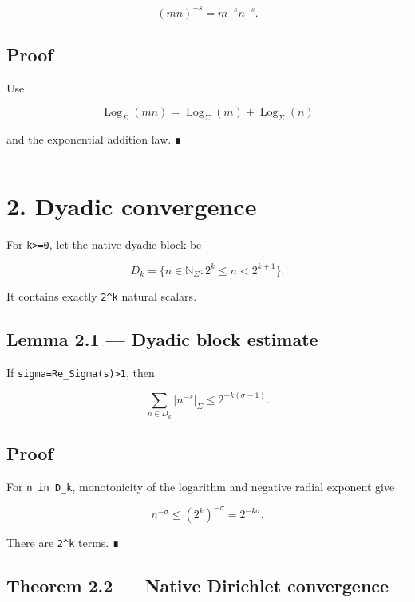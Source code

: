 \[
\boxed{(mn)^{-s}=m^{-s}n^{-s}.}
\]

\hypertarget{proof-1}{%
\subsection{Proof}\label{proof-1}}

Use

\[
\operatorname{Log}_\Sigma(mn)
=
\operatorname{Log}_\Sigma(m)+
\operatorname{Log}_\Sigma(n)
\]

and the exponential addition law. ∎

\begin{center}\rule{0.5\linewidth}{0.5pt}\end{center}

\hypertarget{dyadic-convergence}{%
\section{2. Dyadic convergence}\label{dyadic-convergence}}

For \texttt{k\textgreater{}=0}, let the native dyadic block be

\[
D_k=\{n\in\mathbb N_\Sigma:2^k\le n<2^{k+1}\}.
\]

It contains exactly \texttt{2\^{}k} natural scalars.

\hypertarget{lemma-2.1-dyadic-block-estimate}{%
\subsection{Lemma 2.1 --- Dyadic block estimate}\label{lemma-2.1-dyadic-block-estimate}}

If \texttt{sigma=Re\_Sigma(s)\textgreater{}1}, then

\[
\boxed{
\sum_{n\in D_k}|n^{-s}|_\Sigma
\le
2^{-k(\sigma-1)}.
}
\]

\hypertarget{proof-2}{%
\subsection{Proof}\label{proof-2}}

For \texttt{n\ in\ D\_k}, monotonicity of the logarithm and negative radial exponent give

\[
n^{-\sigma}\le(2^k)^{-\sigma}=2^{-k\sigma}.
\]

There are \texttt{2\^{}k} terms. ∎

\hypertarget{theorem-2.2-native-dirichlet-convergence}{%
\subsection{Theorem 2.2 --- Native Dirichlet convergence}\label{theorem-2.2-native-dirichlet-convergence}}

